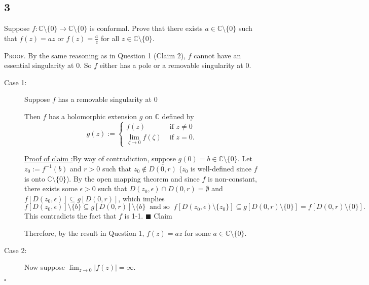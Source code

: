 \documentclass[12pt]{article}
\newcounter{ProofCounter}
\newcounter{ClaimCounter}[ProofCounter]
\newenvironment{Proof}{\stepcounter{ProofCounter}\textsc{Proof.}}{\hfill$\square$}
\newenvironment{claim}[1]{\vspace{1mm}\stepcounter{ClaimCounter}\par\noindent\underline{\bf Claim \theClaimCounter:}\space#1}{}
\newenvironment{claimproof}[1]{\par\noindent\underline{Proof of claim \theClaimCounter:}\space#1}{\hfill $\blacksquare$ Claim \theClaimCounter}
\begin{document}
\subsection*{3}
\begin{tcolorbox}
  Suppose $f : \mathbb{C}\setminus \{0\}\rightarrow \mathbb{C}\setminus\{0\}$ is conformal. Prove that there exists $a \in \mathbb{C} \setminus \{0\}$
  such that $f(z) = az$ or $f(z) = \frac{a}{z}$ for all $z \in \mathbb{C}\setminus \{0\}$.
\end{tcolorbox}
\begin{Proof}
  By the same reasoning as in Question 1 (Claim 2), $f$ cannot have an essential singularity at $0$. So $f$ either has a pole or a removable
  singularity at $0$.  
  \begin{description}
    \item[Case 1:] Suppose $f$ has a removable singularity at $0$

      Then $f$ has a holomorphic extension $g$ on $\mathbb{C}$ defined by
      \[ 
        g(z) := \left\{ \begin{array}{cl}
            f(z) & \text{ if } z \neq 0 \\
            \lim_{\zeta\rightarrow 0}f(\zeta) & \text{ if } z = 0.
        \end{array} \right.
      \]
      \begin{claimproof}
        By way of contradiction, suppose $g(0) = b \in \mathbb{C}\setminus\{0\}$. Let $z_0 := f^{-1}(b)$ and $r > 0$ such that $z_0 \notin
        \overline{D(0,r)}$ ($z_0$ is well-defined since $f$ is onto $\mathbb{C}\setminus \{0\}$). 
        By the open mapping theorem and since $f$ is non-constant, there exists some $\epsilon > 0$ such that $D(z_0, \epsilon)
        \cap D(0,r) = \emptyset$ and $f[D(z_0,\epsilon)] \subseteq g[D(0,r)]$, which implies
        \[ f[D(z_0,\epsilon)]\setminus\{b\} \subseteq g[D(0,r)]\setminus\{b\} \ \text{ and so } \ f[D(z_0, \epsilon)\setminus\{z_0\}] \subseteq
        g[D(0,r)\setminus\{0\}] = f[D(0,r)\setminus\{0\}]. \]
        This contradicts the fact that $f$ is 1-1. %
      \end{claimproof}

      Therefore, by the result in Question 1, $f(z) = az$ for some $a \in \mathbb{C}\setminus\{0\}$.

    \item[Case 2:] Now suppose $\lim_{z\rightarrow 0}|f(z)| = \infty$.


\end{description}
\end{Proof}
\end{document}
